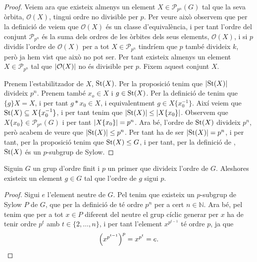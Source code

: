 \documentclass[../Apunts.tex]{subfiles}
\begin{document}
\begin{theorem}
\begin{proof}
			Veiem ara que existeix almenys un element \(X\in\mathcal{P}_{p^{n}}(G)\) tal que la seva òrbita, \(\mathcal{O}(X)\), tingui ordre no divisible per \(p\). Per veure això observem que per la definició de  veiem que \(\mathcal{O}(X)\) és un classe d'equivalència, i per tant l'ordre del conjunt \(\mathcal{P}_{p^{n}}\) és la suma dels ordres de les òrbites dels seus elements, \(\mathcal{O}(X)\), i si \(p\) dividís l'ordre de \(\mathcal{O}(X)\) per a tot \(X\in\mathcal{P}_{p^{n}}\) tindríem que \(p\) també divideix \(k\), però ja hem vist que això no pot ser. Per tant existeix almenys un element \(X\in\mathcal{P}_{p^{n}}\) tal que \(\abs{\mathcal{O}(X)}\) no és divisible per \(p\). Fixem aquest conjunt \(X\).
			
			Prenem l'estabilitzador de \(X\), \(\operatorname{St}(X)\). Per la proposició  tenim que \(\abs{\St(X)}\) divideix \(p^{n}\). Prenem també \(x_{o}\in X\) i \(g\in\operatorname{St}(X)\). Per la definició de  tenim que \(\{g\}X=X\), i per tant \(g\ast x_{0}\in X\), i equivalentment \(g\in X\{x_{0}^{-1}\}\). Així veiem que \(\operatorname{St}(X)\subseteq X\{x_{0}^{-1}\}\), i per tant tenim que \(\abs{\St(X)}\leq\abs{X\{x_{0}\}}\). Observem que \(X\{x_{0}\}\in\mathcal{P}_{p^{n}}(G)\) i per tant \(\abs{X\{x_{0}\}}=p^{n}\). Ara bé, l'ordre de \(\operatorname{St}(X)\) divideix \(p^{n}\), però acabem de veure que \(\abs{\St(X)}\leq p^{n}\). Per tant ha de ser \(\abs{\St(X)}=p^{n}\), i per tant, per la proposició  tenim que \(\operatorname{St}(X)\leq G\), i per tant, per la definició de , \(\operatorname{St}(X)\) és un \(p\)-subgrup de Sylow.
		\end{proof}
	\end{theorem}
	\begin{corollary}
		\label{thm:Teorema de Cauchy per grups}
		Siguin \(G\) un grup d'ordre finit i \(p\) un primer que divideix l'ordre de \(G\). Aleshores existeix un element \(g\in G\) tal que l'ordre de \(g\) sigui \(p\).
		\begin{proof}
			Sigui \(e\) l'element neutre de \(G\). Pel  tenim que existeix un \(p\)-subgrup de Sylow \(P\) de \(G\), que per la definició de  té ordre \(p^{n}\) per a cert \(n\in\mathbb{N}\). Ara bé, pel  tenim que per a tot \(x\in P\) diferent del neutre el grup cíclic generar per \(x\) ha de tenir ordre \(p^{t}\) amb \(t\in\{2,\dots,n\}\), i per tant l'element \(x^{p^{t-1}}\) té ordre \(p\), ja que 
			\[\left(x^{p^{t-1}}\right)^{p}=x^{p^{t}}=e.\qedhere\]
		\end{proof}
	\end{corollary}
\end{document}
